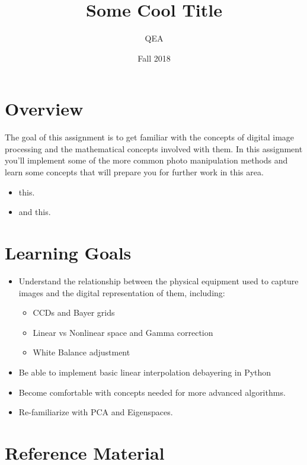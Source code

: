 \documentclass{tufte-handout}
\title{Some Cool Title}
\author{QEA}
\date{Fall 2018}
\begin{document}
\maketitle
\thispagestyle{firstpage}


\section{Overview}
The goal of this assignment is to get familiar with the concepts of digital image processing and the mathematical concepts involved with them. In this assignment you'll implement some of the more common photo manipulation methods and learn some concepts that will prepare you for further work in this area.
\begin{itemize}
\item this.
\item and this.
\end{itemize}

\section{Learning Goals}

\begin{itemize}
\item Understand the relationship between the physical equipment used to capture
images and the digital representation of them, including:
    \begin{itemize}
        \item CCDs and Bayer grids
        \item Linear vs Nonlinear space and Gamma correction
        \item White Balance adjustment
    \end{itemize}
\item Be able to implement basic linear interpolation debayering in Python
\item Become comfortable with concepts needed for more advanced algorithms.
\item Re-familiarize with PCA and Eigenspaces.
\end{itemize}


\section{Reference Material}
\end{document}
